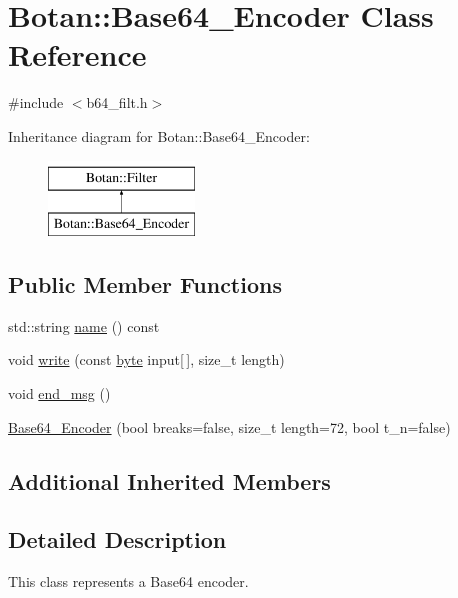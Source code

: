 \hypertarget{classBotan_1_1Base64__Encoder}{\section{Botan\-:\-:Base64\-\_\-\-Encoder Class Reference}
\label{classBotan_1_1Base64__Encoder}
}


{\ttfamily \#include $<$b64\-\_\-filt.\-h$>$}

Inheritance diagram for Botan\-:\-:Base64\-\_\-\-Encoder\-:\begin{figure}[H]
\begin{center}
\leavevmode
\includegraphics[height=2.000000cm]{classBotan_1_1Base64__Encoder}
\end{center}
\end{figure}
\subsection*{Public Member Functions}
\begin{DoxyCompactItemize}
\item 
std\-::string \hyperlink{classBotan_1_1Base64__Encoder_a2e0135e3f3f62f2a3e427a93cc3e7eff}{name} () const 
\item 
void \hyperlink{classBotan_1_1Base64__Encoder_abdc4e61afb33dcba4041563d75c91637}{write} (const \hyperlink{namespaceBotan_a7d793989d801281df48c6b19616b8b84}{byte} input\mbox{[}$\,$\mbox{]}, size\-\_\-t length)
\item 
void \hyperlink{classBotan_1_1Base64__Encoder_a12b16ecb4124a3e9b9a2cb67ca53efb5}{end\-\_\-msg} ()
\item 
\hyperlink{classBotan_1_1Base64__Encoder_a123d6ba8ff59c02636e00f87a5dc9a8c}{Base64\-\_\-\-Encoder} (bool breaks=false, size\-\_\-t length=72, bool t\-\_\-n=false)
\end{DoxyCompactItemize}
\subsection*{Additional Inherited Members}


\subsection{Detailed Description}
This class represents a Base64 encoder. 

